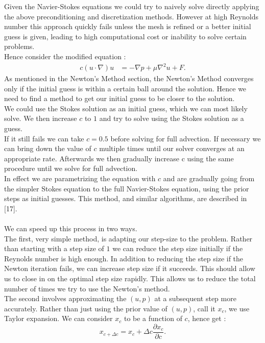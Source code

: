 \documentclass[11pt,twoside,a4paper]{article}
\begin{document}
Given the Navier-Stokes equations we could try to naively solve directly applying the above preconditioning and discretization methods. However at high Reynolds number this approach quickly fails unless the mesh is refined or a better initial guess is given, leading to high computational cost or inability to solve certain problems.\\
Hence consider the modified equation :
\begin{align}
c (u \cdot \nabla) u &= -\nabla p + \mu \nabla^2 u + F .
\end{align}
As mentioned in the Newton's Method section, the Newton's Method converges only if the initial guess is within a certain ball around the solution. Hence we need to find a method to get our initial guess to be closer to the solution.\\
We could use the Stokes solution as an initial guess, which we can most likely solve. We then increase $c$ to $1$ and try to solve using the Stokes solution as a guess. \\
If it still fails we can take $c =0.5$ before solving for full advection. If necessary we can bring down the value of $c$ multiple times until our solver converges at an appropriate rate. Afterwards we then gradually increase c using the same procedure until we solve for full advection.\\
In effect we are parametrizing the equation with $c$ and are gradually going from the simpler Stokes equation to the full Navier-Stokes equation, using the prior steps as initial guesses. This method, and similar algorithms, are described in [17].\\
\\
We can speed up this process in two ways.\\
The first, very simple method, is adapting our step-size to the problem. Rather than starting with a step size of $1$ we can reduce the step size initially if the Reynolds number is high enough. In addition to reducing the step size if the Newton iteration fails, we can increase step size if it succeeds. This should allow us to close in on the optimal step size rapidly. This allows us to reduce the total number of times we try to use the Newton's method.\\
The second involves approximating the $(u,p)$ at a subsequent step more accurately. Rather than just using the prior value of $(u,p)$, call it $x_c$, we use Taylor expansion. We can consider $x_c$ to be a function of $c$, hence get :
$$
x_{c+\Delta c} = x_c + \Delta c \frac{\partial x_c}{\partial c} .
$$
\end{document}

